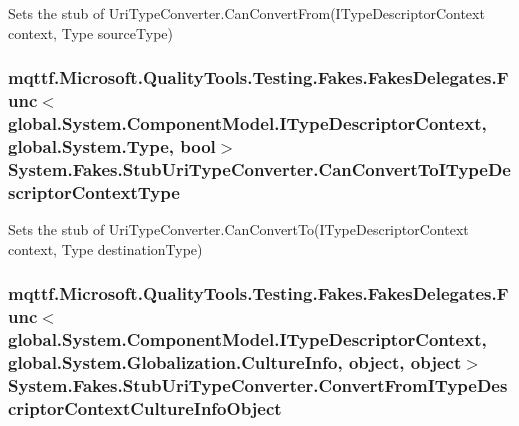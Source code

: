 Sets the stub of Uri\-Type\-Converter.\-Can\-Convert\-From(\-I\-Type\-Descriptor\-Context context, Type source\-Type)

\hypertarget{class_system_1_1_fakes_1_1_stub_uri_type_converter_a5efd90f7062cc07a37a0443179ce13e3}{
\subsubsection[{Can\-Convert\-To\-I\-Type\-Descriptor\-Context\-Type}]{\setlength{\rightskip}{0pt plus 5cm}mqttf.\-Microsoft.\-Quality\-Tools.\-Testing.\-Fakes.\-Fakes\-Delegates.\-Func$<$global.\-System.\-Component\-Model.\-I\-Type\-Descriptor\-Context, global.\-System.\-Type, bool$>$ System.\-Fakes.\-Stub\-Uri\-Type\-Converter.\-Can\-Convert\-To\-I\-Type\-Descriptor\-Context\-Type}}\label{class_system_1_1_fakes_1_1_stub_uri_type_converter_a5efd90f7062cc07a37a0443179ce13e3}


Sets the stub of Uri\-Type\-Converter.\-Can\-Convert\-To(\-I\-Type\-Descriptor\-Context context, Type destination\-Type)

\hypertarget{class_system_1_1_fakes_1_1_stub_uri_type_converter_ace07103708dc7ebb6223eff888d1799f}{
\subsubsection[{Convert\-From\-I\-Type\-Descriptor\-Context\-Culture\-Info\-Object}]{\setlength{\rightskip}{0pt plus 5cm}mqttf.\-Microsoft.\-Quality\-Tools.\-Testing.\-Fakes.\-Fakes\-Delegates.\-Func$<$global.\-System.\-Component\-Model.\-I\-Type\-Descriptor\-Context, global.\-System.\-Globalization.\-Culture\-Info, object, object$>$ System.\-Fakes.\-Stub\-Uri\-Type\-Converter.\-Convert\-From\-I\-Type\-Descriptor\-Context\-Culture\-Info\-Object}}\label{class_system_1_1_fakes_1_1_stub_uri_type_converter_ace07103708dc7ebb6223eff888d1799f}


